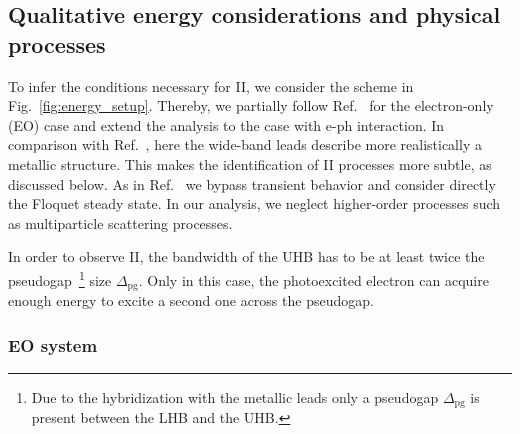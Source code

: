 \documentclass[aps,prb,groupedaddress,showpacs,twocolumn,superscriptaddress,10pt]{revtex4-2}
\begin{document}
\subsection{Qualitative energy considerations and physical processes}
\label{sec:explicative_scheme}
 
To infer the conditions necessary for II, we consider the  scheme in Fig.~\ref{fig:energy_setup}. Thereby, we partially follow Ref.~\cite{so.do.18} for the electron-only (EO) case and extend the analysis to the case with e-ph interaction. In comparison with Ref.~\cite{so.do.18}, here the wide-band leads describe more realistically a metallic structure. This makes the identification of II processes more subtle, as discussed below. As in Ref.~\cite{so.do.18} we bypass transient behavior and consider directly the Floquet steady state. In our analysis, we neglect higher-order processes such as multiparticle scattering processes. 

In order to observe II, the bandwidth of the UHB has to be at least twice the pseudogap~\footnote{Due to the hybridization with the metallic leads only a pseudogap $\Delta_{\text{pg}}$ is present between the LHB and the UHB.} size $\Delta_{\text{pg}}$. Only in this case, the photoexcited electron can acquire enough energy to excite a second one across the pseudogap. 
   
  
\subsubsection{EO system}
\label{sec:scheme_only_electrons}  
 
\end{document}
